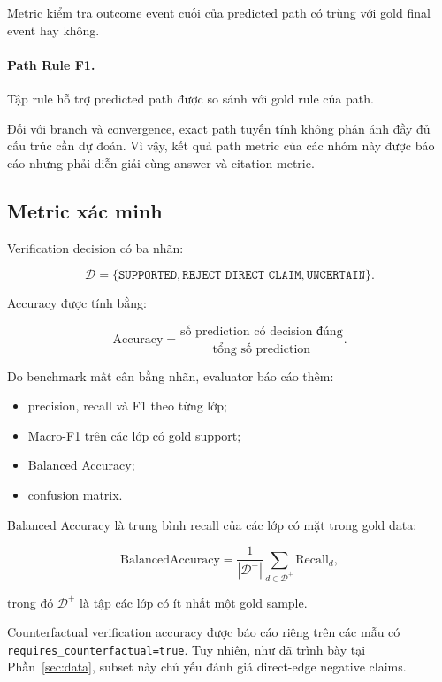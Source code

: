 Metric kiểm tra outcome event cuối của predicted path có trùng với gold final
event hay không.

\paragraph{Path Rule F1.}

Tập rule hỗ trợ predicted path được so sánh với gold rule của path.

Đối với branch và convergence, exact path tuyến tính không phản ánh đầy đủ
cấu trúc cần dự đoán. Vì vậy, kết quả path metric của các nhóm này được báo
cáo nhưng phải diễn giải cùng answer và citation metric.

\subsection{Metric xác minh}

Verification decision có ba nhãn:

\[
\mathcal{D}
=
\{
\texttt{SUPPORTED},
\texttt{REJECT\_DIRECT\_CLAIM},
\texttt{UNCERTAIN}
\}.
\]

Accuracy được tính bằng:

\begin{equation}
\mathrm{Accuracy}
=
\frac{
    \text{số prediction có decision đúng}
}{
    \text{tổng số prediction}
}.
\end{equation}

Do benchmark mất cân bằng nhãn, evaluator báo cáo thêm:

\begin{itemize}
    \item precision, recall và F1 theo từng lớp;
    \item Macro-F1 trên các lớp có gold support;
    \item Balanced Accuracy;
    \item confusion matrix.
\end{itemize}

Balanced Accuracy là trung bình recall của các lớp có mặt trong gold data:

\begin{equation}
\mathrm{BalancedAccuracy}
=
\frac{1}{|\mathcal{D}^{+}|}
\sum_{d \in \mathcal{D}^{+}}
\mathrm{Recall}_d,
\end{equation}

trong đó \(\mathcal{D}^{+}\) là tập các lớp có ít nhất một gold sample.

Counterfactual verification accuracy được báo cáo riêng trên các mẫu có
\texttt{requires\_counterfactual=true}. Tuy nhiên, như đã trình bày tại
Phần~\ref{sec:data}, subset này chủ yếu đánh giá direct-edge negative claims.

